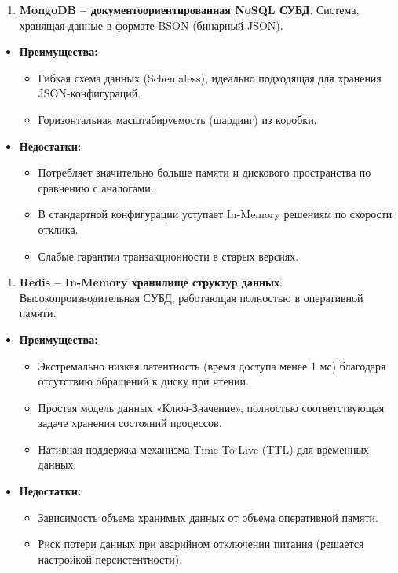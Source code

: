 \documentclass[
]{article}
\begin{document}
\begin{enumerate}
\def\labelenumi{\arabic{enumi}.}
\setcounter{enumi}{2}
\item
  \textbf{MongoDB -- документоориентированная NoSQL СУБД}. Система,
  хранящая данные в формате BSON (бинарный JSON).
\end{enumerate}

\begin{itemize}
\item
  \textbf{Преимущества:}

  \begin{itemize}
  \item
    Гибкая схема данных (Schemaless), идеально подходящая для хранения
    JSON-конфигураций.
  \item
    Горизонтальная масштабируемость (шардинг) из коробки.
  \end{itemize}
\item
  \textbf{Недостатки:}

  \begin{itemize}
  \item
    Потребляет значительно больше памяти и дискового пространства по
    сравнению с аналогами.
  \item
    В стандартной конфигурации уступает In-Memory решениям по скорости
    отклика.
  \item
    Слабые гарантии транзакционности в старых версиях.
  \end{itemize}
\end{itemize}

\begin{enumerate}
\def\labelenumi{\arabic{enumi}.}
\setcounter{enumi}{3}
\item
  \textbf{Redis -- In-Memory хранилище структур данных}.
  Высокопроизводительная СУБД, работающая полностью в оперативной
  памяти.
\end{enumerate}

\begin{itemize}
\item
  \textbf{Преимущества:}

  \begin{itemize}
  \item
    Экстремально низкая латентность (время доступа менее 1 мс) благодаря
    отсутствию обращений к диску при чтении.
  \item
    Простая модель данных «Ключ-Значение», полностью соответствующая
    задаче хранения состояний процессов.
  \item
    Нативная поддержка механизма Time-To-Live (TTL) для временных
    данных.
  \end{itemize}
\item
  \textbf{Недостатки:}

  \begin{itemize}
  \item
    Зависимость объема хранимых данных от объема оперативной памяти.
  \item
    Риск потери данных при аварийном отключении питания (решается
    настройкой персистентности).
  \end{itemize}
\end{itemize}
\end{document}
